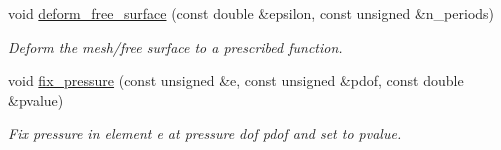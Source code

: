 \begin{DoxyCompactItemize}
void \hyperlink{classInterfaceProblem_a2319232b08d9df1ab473f6cbd40939d5}{deform\+\_\+free\+\_\+surface} (const double \&epsilon, const unsigned \&n\+\_\+periods)
\begin{DoxyCompactList}\small\item\em Deform the mesh/free surface to a prescribed function. \end{DoxyCompactList}\item 
void \hyperlink{classInterfaceProblem_a9d1a04da451b6f41336cb6f3bd910633}{fix\+\_\+pressure} (const unsigned \&e, const unsigned \&pdof, const double \&pvalue)
\begin{DoxyCompactList}\small\item\em Fix pressure in element e at pressure dof pdof and set to pvalue. \end{DoxyCompactList}\end{DoxyCompactItemize}
